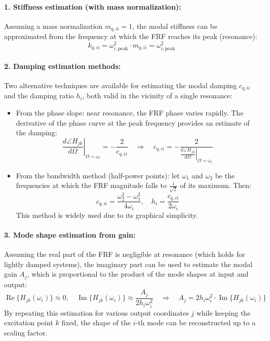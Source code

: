 \paragraph{1. Stiffness estimation (with mass normalization):} Assuming a mass normalization \( m_{q,ii} = 1 \), the modal stiffness can be approximated from the frequency at which the FRF reaches its peak (resonance):
\[
k_{q,ii} = \omega_{i, \text{peak}}^2 \cdot m_{q,ii} = \omega_{i, \text{peak}}^2
\]

\paragraph{2. Damping estimation methods:} Two alternative techniques are available for estimating the modal damping \( c_{q,ii} \) and the damping ratio \( h_i \), both valid in the vicinity of a single resonance:

\begin{itemize}
    \item From the phase slope: near resonance, the FRF phase varies rapidly. The derivative of the phase curve at the peak frequency provides an estimate of the damping:
    \[
    \left. \frac{d\angle H_{jk}}{d\Omega} \right|_{\Omega = \omega_{i}} = -\frac{2}{c_{q,ii}} 
    \quad \Rightarrow \quad
    c_{q,ii} = -\frac{2}{\left. \frac{d\angle H_{jk}}{d\Omega} \right|_{\Omega = \omega_i}}
    \]

    \item From the bandwidth method (half-power points): let \( \omega_1 \) and \( \omega_2 \) be the frequencies at which the FRF magnitude falls to \( \frac{1}{\sqrt{2}} \) of its maximum. Then:
    \[
    c_{q,ii} = \frac{\omega_2^2 - \omega_1^2}{4 \omega_i}, \quad
    h_i = \frac{c_{q,ii}}{2 \omega_i}
    \]
    This method is widely used due to its graphical simplicity.
\end{itemize}

\paragraph{3. Mode shape estimation from gain:} Assuming the real part of the FRF is negligible at resonance (which holds for lightly damped systems), the imaginary part can be used to estimate the modal gain \( A_{j} \), which is proportional to the product of the mode shapes at input and output:
\[
\operatorname{Re}\{ H_{jk}(\omega_i) \} \approx 0, \quad 
\operatorname{Im}\{ H_{jk}(\omega_i) \} \approx \frac{A_{j}}{2 h_i \omega_i^2}
\quad \Rightarrow \quad
A_{j} = 2 h_i \omega_i^2 \cdot \operatorname{Im}\{ H_{jk}(\omega_i) \}
\]
By repeating this estimation for various output coordinates \( j \) while keeping the excitation point \( k \) fixed, the shape of the \( i \)-th mode can be reconstructed up to a scaling factor. 
